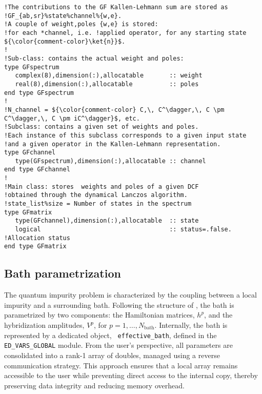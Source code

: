 \documentclass[edipack_sp.tex]{subfiles}
\begin{document}
\begin{lstlisting}[style=fstyle,numbers=none]   
!The contributions to the GF Kallen-Lehmann sum are stored as
!GF_{ab,sr}%state%channel%{w,e}.
!A couple of weight,poles {w,e} is stored: 
!for each *channel, i.e. !applied operator, for any starting state ${\color{comment-color}\ket{n}}$.
!
!Sub-class: contains the actual weight and poles:
type GFspectrum
   complex(8),dimension(:),allocatable       :: weight
   real(8),dimension(:),allocatable          :: poles
end type GFspectrum
!
!N_channel = ${\color{comment-color} C,\, C^\dagger,\, C \pm C^\dagger,\, C \pm iC^\dagger}$, etc.
!Subclass: contains a given set of weights and poles.
!Each instance of this subclass corresponds to a given input state 
!and a given operator in the Kallen-Lehmann representation.  
type GFchannel
   type(GFspectrum),dimension(:),allocatable :: channel 
end type GFchannel
!
!Main class: stores  weights and poles of a given DCF 
!obtained through the dynamical Lanczos algorithm.
!state_list%size = Number of states in the spectrum 
type GFmatrix
   type(GFchannel),dimension(:),allocatable  :: state
   logical                                   :: status=.false. !Allocation status
end type GFmatrix
\end{lstlisting}




















\subsection{Bath parametrization}\label{sSecBath}
The quantum impurity problem is characterized by the coupling between
a local impurity and a surrounding bath. Following the structure of
, the bath is parametrized by two components: the
Hamiltonian matrices, $h^p$, and the hybridization amplitudes,
$V^p$, for $p = 1, \dots, N_\mathrm{bath}$.
Internally, the bath is represented by a dedicated object, {\tt
  effective\_bath}, defined in the {\tt ED\_VARS\_GLOBAL} module. From
the user's perspective, all parameters are consolidated into a rank-1
array of doubles, managed using a reverse communication strategy. This
approach ensures that a local array remains accessible to the
user while preventing direct access to the internal copy, thereby
preserving data integrity and reducing memory overhead.
\end{document}
